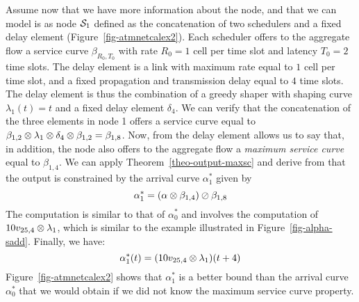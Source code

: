 Assume now that we have more information about the node, and that
we can model is as node $\mathcal S_1$ defined as the concatenation of
two schedulers and a fixed delay element
(Figure~\ref{fig-atmnetcalex2}). Each scheduler offers to the
aggregate flow a service curve $\beta_{R_0,T_0}$ with rate $R_0=1$
cell per time slot and latency $T_0=2$ time slots. The delay
element is a link with maximum rate equal to $1$ cell per time
slot, and a fixed propagation and transmission delay equal to $4$
time slots. The delay element is thus the combination of a greedy
shaper with shaping curve $\lambda_1(t)=t$ and a fixed delay
element $\delta_4$. We can verify that the concatenation of the
three elements in node 1 offers a service curve equal to
$\beta_{1,2} \otimes \lambda_1 \otimes \delta_4 \otimes \beta_{1,2}=
\beta_{1,8}$. Now, from the delay element allows us to say that,
in addition, the node also offers to the aggregate flow a
\emph{maximum service curve} equal to $\beta_{1,4}$. We can apply
Theorem~\ref{theo-output-maxsc} and derive from that the output is
constrained by the arrival curve $\alpha^*_1$ given by
$$\alpha^*_1=\left( \alpha \otimes \beta_{1,4} \right) \oslash
\beta_{1,8}
$$
The computation is similar to that of $\alpha^*_0$ and involves
the computation of $10 v_{25, 4} \otimes \lambda_1$, which is similar
to the example illustrated in Figure~\ref{fig-alpha-sadd}.
Finally, we have:
 $$\alpha^*_1(t) = (10 v_{25, 4} \otimes \lambda_1)(t+4) $$
Figure~\ref{fig-atmnetcalex2} shows that $\alpha^*_1$ is a better
bound than the arrival curve $\alpha^*_0$ that we would obtain if
we did not know the maximum service curve property.
\begin{figure}[!htbp]
\end{figure}

